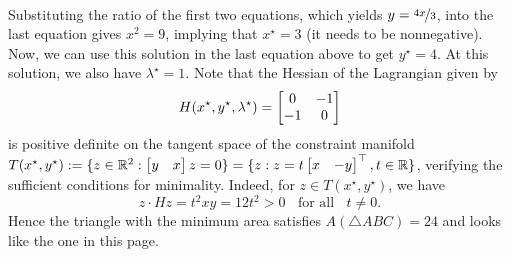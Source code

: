 \begin{minipage}{0.4\textwidth}
\begin{center}
    \end{center}
\end{minipage}\\[1ex]
%
Substituting the ratio of the first two equations, which yields $y =
\nicefrac{4x}{3}$, into the last equation gives $x^2 = 9$, implying that
$x^\star = 3$ (it needs to be nonnegative). Now, we can use this solution in the
last equation above to get $y^\star = 4$. At this solution, we also have
$\lambda^\star=1$. Note that the Hessian of the Lagrangian given by
\[H(x^\star, y^\star, \lambda^\star) = \begin{bmatrix}
    0 & -1 \\ -1 & 0
\end{bmatrix} \]
%
is positive definite on the tangent space of the constraint manifold $T(x^\star,
y^\star) := \{z \in \mathbb{R}^2: \begin{bmatrix}y & x\end{bmatrix}z = 0 \} = \{z: z = t \begin{bmatrix}x &
-y\end{bmatrix}^\top, t \in \mathbb{R}\}$, verifying the sufficient conditions for
minimality. Indeed, for $z \in T(x^\star, y^\star)$, we have 
\[z \cdot Hz = t^2 xy = 12t^2 > 0 \;\; \text{ for all } \;\; t \neq 0. \]
%
Hence the triangle with the minimum area satisfies $A(\triangle ABC) = 24$ and
looks like the one in this page.
%
